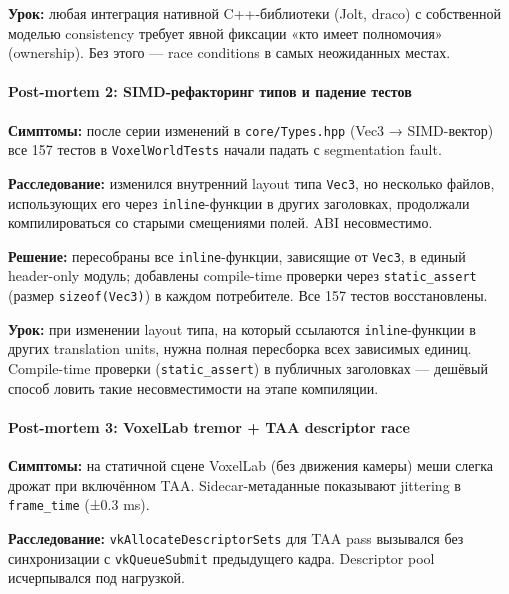 \textbf{Урок:} любая интеграция нативной C++-библиотеки (Jolt, draco) с собственной моделью consistency требует явной фиксации «кто имеет полномочия» (ownership). Без этого --- race conditions в самых неожиданных местах.

\paragraph{Post-mortem 2: SIMD-рефакторинг типов и падение тестов}\label{KT-3.2_Final_Report-post-mortem-2-simd-ux440ux435ux444ux430ux43aux442ux43eux440ux438ux43dux433-ux442ux438ux43fux43eux432-ux438-ux43fux430ux434ux435ux43dux438ux435-ux442ux435ux441ux442ux43eux432}

\textbf{Симптомы:} после серии изменений в \texttt{core/Types.hpp} (Vec3 → SIMD-вектор) все 157 тестов в \texttt{VoxelWorldTests} начали падать с segmentation fault.

\textbf{Расследование:} изменился внутренний layout типа \texttt{Vec3}, но несколько файлов, использующих его через \texttt{inline}-функции в других заголовках, продолжали компилироваться со старыми смещениями полей. ABI несовместимо.

\textbf{Решение:} пересобраны все \texttt{inline}-функции, зависящие от \texttt{Vec3}, в единый header-only модуль; добавлены compile-time проверки через \texttt{static\_assert} (размер \texttt{sizeof(Vec3)}) в каждом потребителе. Все 157 тестов восстановлены.

\textbf{Урок:} при изменении layout типа, на который ссылаются \texttt{inline}-функции в других translation units, нужна полная пересборка всех зависимых единиц. Compile-time проверки (\texttt{static\_assert}) в публичных заголовках --- дешёвый способ ловить такие несовместимости на этапе компиляции.

\paragraph{Post-mortem 3: VoxelLab tremor + TAA descriptor race}\label{KT-3.2_Final_Report-post-mortem-3-voxellab-tremor--taa-descriptor-race}

\textbf{Симптомы:} на статичной сцене VoxelLab (без движения камеры) меши слегка дрожат при включённом TAA. Sidecar-метаданные показывают jittering в \texttt{frame\_time} (±0.3 ms).

\textbf{Расследование:} \texttt{vkAllocateDescriptorSets} для TAA pass вызывался без синхронизации с \texttt{vkQueueSubmit} предыдущего кадра. Descriptor pool исчерпывался под нагрузкой.

